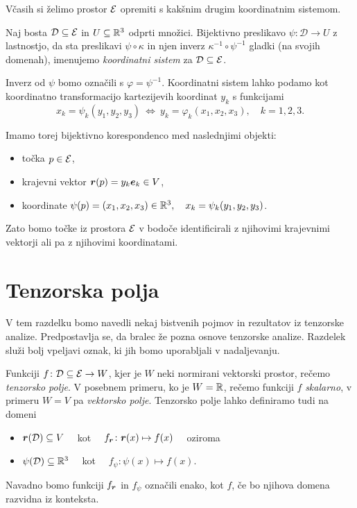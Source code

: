 Včasih si želimo prostor $\mathcal E$ opremiti s kakšnim drugim koordinatnim sistemom.
\begin{definicija}\label{d:ks}
	Naj bosta $\mathcal{D}\subseteq\mathcal E$ in $U\subseteq\mathbb R^3$ odprti množici. Bijektivno preslikavo
	$\psi\colon\mathcal{D}\to U$ z lastnostjo, da sta preslikavi $\psi\circ\kappa$ in njen inverz
	$\kappa^{-1}\circ\psi^{-1}$ gladki (na svojih domenah), imenujemo \emph{koordinatni sistem}
	za $\mathcal{D}\subseteq\mathcal E$.
\end{definicija}
Inverz od $\psi$ bomo označili s $\varphi=\psi^{-1}$.
Koordinatni sistem lahko podamo kot koordinatno transformacijo kartezijevih koordinat $y_k$ s funkcijami
\begin{equation*}
	x_k = \psi_k(y_1,y_2,y_3) \ \Leftrightarrow \ y_k=\varphi_k(x_1,x_2,x_3), \quad k=1,2,3.
\end{equation*}

Imamo torej bijektivno korespondenco med naslednjimi objekti:
\begin{itemize}
	\item točka $p\in\mathcal E$,
	\item krajevni vektor $\boldsymbol r(p)=y_k\boldsymbol e_k\in V$,
	\item koordinate $\psi(p)=(x_1,x_2,x_3)\in\mathbb R^3, \quad x_k=\psi_k(y_1,y_2,y_3)$.
\end{itemize}
Zato bomo točke iz prostora $\mathcal E$ v bodoče identificirali z njihovimi krajevnimi vektorji ali pa z njihovimi koordinatami.


\section{Tenzorska polja}


V tem razdelku bomo navedli nekaj bistvenih pojmov in rezultatov iz tenzorske analize. Predpostavlja
se, da bralec že pozna osnove tenzorske analize. Razdelek služi bolj vpeljavi oznak, ki jih
bomo uporabljali v nadaljevanju.

Funkciji $f\colon\mathcal{D}\subseteq\mathcal E\to W$, kjer je $W$ neki normirani vektorski prostor, rečemo
\emph{tenzorsko polje}. V posebnem primeru, ko je $W=\mathbb R$, rečemo funkciji $f$ \emph{skalarno},
v primeru $W=V$ pa \emph{vektorsko polje}. Tenzorsko polje lahko definiramo tudi na domeni
\begin{itemize}
	\item $\boldsymbol r(\mathcal{D})\subseteq V \quad$ kot $\quad f_{\boldsymbol r}\colon\boldsymbol r(x)\mapsto f(x) \quad$ oziroma
	\item $\psi(\mathcal{D})\subseteq\mathbb R^3 \quad$ kot $\quad f_{\psi}\colon \psi(x)\mapsto f(x)$.
\end{itemize}
Navadno bomo funkciji $f_{\boldsymbol r}$ in $f_{\psi}$ označili enako, kot $f$, če bo njihova
domena razvidna iz konteksta.

